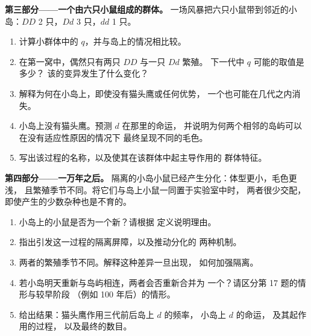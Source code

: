 \begin{problem}
\medskip
\noindent\textbf{第三部分——一个由六只小鼠组成的群体。}
一场风暴把六只小鼠带到邻近的小岛：$DD$ 2 只，$Dd$ 3 只，$dd$ 1 只。
\begin{enumerate}[resume]
  \item 计算小群体中的 $q$，并与岛上的情况相比较。
  \item 在第一窝中，偶然只有两只 $DD$ 与一只 $Dd$ 繁殖。
        下一代中 $q$ 可能的取值是多少？
        该的变异发生了什么变化？
  \item 解释为何在小岛上，即使没有猫头鹰或任何优势，
        一个也可能在几代之内消失。
  \item 小岛上没有猫头鹰。预测 $d$ 在那里的命运，
        并说明为何两个相邻的岛屿可以在没有适应性原因的情况下
        最终呈现不同的毛色。
  \item 写出该过程的名称，以及使其在该群体中起主导作用的
        群体特征。
\end{enumerate}

\medskip
\noindent\textbf{第四部分——一万年之后。}
隔离的小岛小鼠已经产生分化：体型更小，毛色更浅，
且繁殖季节不同。将它们与岛上小鼠一同置于实验室中时，
两者很少交配，即使产生的少数杂种也是不育的。
\begin{enumerate}[resume]
  \item 小岛上的小鼠是否为一个新？请根据
        定义说明理由。
  \item 指出引发这一过程的隔离屏障，以及推动分化的
        两种机制。
  \item 两者的繁殖季节不同。解释这种差异一旦出现，
        如何加强隔离。
  \item 若小岛明天重新与岛屿相连，两者会否重新合并为
        一个？请区分第 17 题的情形与较早阶段
        （例如 100 年后）的情形。
  \item 给出结果：猫头鹰作用三代前后岛上 $d$ 的频率，
        小岛上 $d$ 的命运，
        及其起作用的过程，
        以及最终的数目。
\end{enumerate}
\end{problem}
